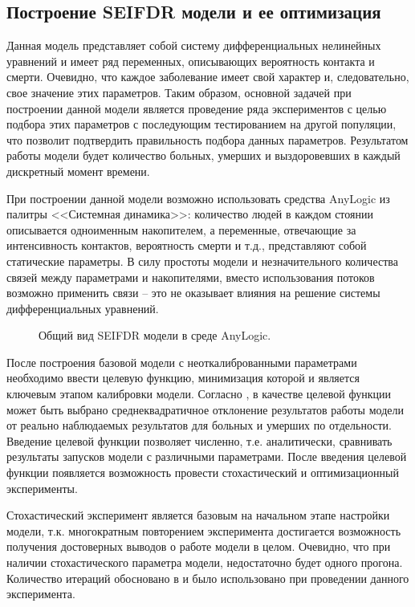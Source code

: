 \subsection{Построение SEIFDR модели и ее оптимизация}
Данная модель представляет собой систему дифференциальных нелинейных уравнений %
\cite{Wolfram_MW:SIR} и имеет ряд переменных, описывающих вероятность контакта и смерти. Очевидно, что каждое заболевание имеет свой характер и, следовательно, свое значение этих параметров. Таким образом, основной задачей при построении данной модели является проведение ряда экспериментов с целью подбора этих параметров с последующим тестированием на другой популяции, что позволит подтвердить правильность подбора данных параметров. Результатом работы модели будет  количество больных, умерших и выздоровевших в каждый дискретный момент времени.

При построении данной модели возможно использовать средства AnyLogic из палитры <<Системная динамика>>: количество людей в каждом стоянии описывается одноименным накопителем, а переменные, отвечающие за интенсивность контактов, вероятность смерти и т.д., представляют собой статические параметры. В силу простоты модели и незначительного количества связей между параметрами и накопителями, вместо использования потоков возможно применить связи -- это не оказывает влияния на решение системы дифференциальных уравнений. 


\begin{figure}[H]
	\caption{Общий вид SEIFDR модели в среде AnyLogic.}
\end{figure}


После построения базовой модели с неоткалиброванными параметрами необходимо ввести целевую функцию, минимизация которой и является ключевым этапом калибровки модели. Согласно  %
\cite[с. 26]{Bykova:2015}, в качестве  целевой функции может быть выбрано среднеквадратичное отклонение результатов работы модели от  реально наблюдаемых результатов для больных и  умерших  по отдельности. Введение целевой функции позволяет численно,  т.е. аналитически, сравнивать результаты запусков модели с различными параметрами.
После введения целевой функции появляется возможность провести стохастический и оптимизационный эксперименты.

Стохастический эксперимент является базовым на начальном этапе настройки модели,  т.к. многократным повторением эксперимента достигается возможность получения достоверных выводов о работе модели в целом. Очевидно, что при наличии стохастического параметра модели, недостаточно будет одного прогона. Количество итераций обосновано в  %
\cite{Kondratiev:2010} и было использовано при проведении данного эксперимента. 

